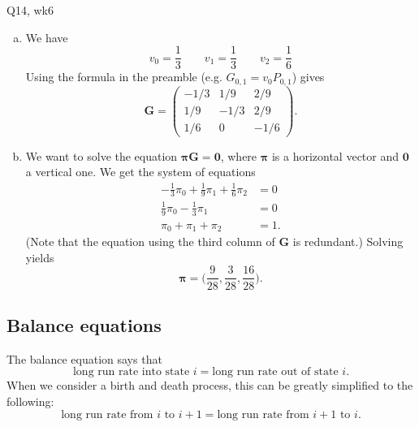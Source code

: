 \begin{problem}{Q14, wk6}{}
    \begin{enumerate}[a)]
        \item We have
                $$ v_0 = \frac{1}{3} \qquad v_1 = \frac{1}{3} \qquad v_2 = \frac{1}{6} $$
            Using the formula in the preamble (e.g. $G_{0, 1} = v_0 P_{0, 1}$) gives
                $$ \mathbf{G} =
                    \begin{pmatrix}
                        -1/3 & 1/9 & 2/9 \\
                        1/9 & -1/3 & 2/9 \\
                        1/6 & 0 & -1/6
                    \end{pmatrix} .
                $$
        \item We want to solve the equation $\mathbf{\pi} \mathbf{G} = \mathbf{0}$, where $\mathbf{\pi}$ is a horizontal vector and $\mathbf{0}$ a vertical one. We get the system of equations
            \begin{align*}
                -\frac{1}{3} \pi_0 + \frac{1}{9} \pi_1 + \frac{1}{6} \pi_2 &= 0 \\
                \frac{1}{9} \pi_0 - \frac{1}{3} \pi_1 &= 0 \\
                \pi_0 + \pi_1 + \pi_2 &= 1 .
            \end{align*}
        (Note that the equation using the third column of $\mathbf{G}$ is redundant.) Solving yields
            $$ \mathbf{\pi} = \biggl( \frac{9}{28}, \frac{3}{28}, \frac{16}{28} \biggr) . $$
    \end{enumerate}

\end{problem}

\subsection{Balance equations}

The balance equation says that
    $$ \text{long run rate into state $i$} = \text{long run rate out of state $i$} . $$
When we consider a birth and death process, this can be greatly simplified to the following:
    $$ \text{long run rate from $i$ to $i + 1$} = \text{long run rate from $i + 1$ to $i$} . $$

